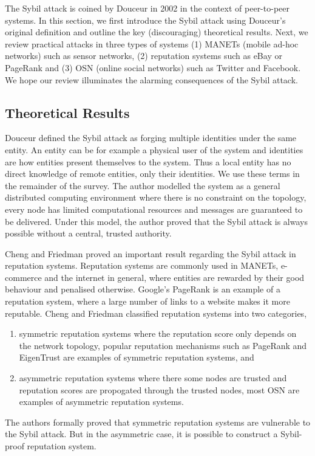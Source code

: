 The Sybil attack is coined by Douceur\cite{douceur2002sybil} in 2002 in the
context of peer-to-peer systems. In this section, we first introduce the Sybil
attack using Douceur's original definition and outline the key (discouraging)
theoretical results. Next, we review practical attacks in three types of systems
(1) MANETs (mobile ad-hoc networks) such as sensor networks, (2) reputation
systems such as eBay or PageRank\cite{page1999pagerank} and (3) OSN (online
social networks) such as Twitter and Facebook. We hope our review illuminates
the alarming consequences of the Sybil attack.

\subsection{Theoretical Results}
Douceur defined the Sybil attack as forging multiple identities under the same
entity\cite{douceur2002sybil}. An entity can be for example a physical user of
the system and identities are how entities present themselves to the system.
Thus a local entity has no direct knowledge of remote entities, only their
identities. We use these terms in the remainder of the survey. The author
modelled the system as a general distributed computing environment where there
is no constraint on the topology, every node has limited computational resources
and messages are guaranteed to be delivered. Under this model, the author proved
that the Sybil attack is always possible without a central, trusted authority.


Cheng and Friedman proved an important result regarding the Sybil attack in
reputation systems\cite{cheng2005sybilproof}. Reputation systems are commonly
used in MANETs, e-commerce and the internet in general, where entities are
rewarded by their good behaviour and penalised otherwise. Google's
PageRank\cite{page1999pagerank} is an example of a reputation system, where a
large number of links to a website makes it more reputable. Cheng and Friedman
classified reputation systems into two categories,
\begin{enumerate}
\item symmetric reputation systems where the reputation score only depends on
  the network topology, popular reputation mechanisms such as
  PageRank\cite{page1999pagerank} and EigenTrust\cite{kamvar2003eigentrust} are
  examples of symmetric reputation systems, and
    \item asymmetric reputation systems where there some nodes are trusted and
      reputation scores are propogated through the trusted nodes, most OSN are
      examples of asymmetric reputation systems.
\end{enumerate}
The authors formally proved that symmetric reputation systems are vulnerable to
the Sybil attack. But in the asymmetric case, it is possible to construct a
Sybil-proof reputation system.

